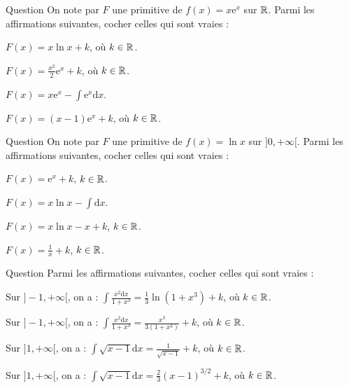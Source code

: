 \begin{multi}[multiple,feedback=
{Une intégration par parties avec \(u=x\) et \(v=\mathrm{e}^x\) donne
\[F(x)=x\mathrm{e}^x-\int \mathrm{e}^x\mathrm{d}x=x\mathrm{e}^x-\mathrm{e}^x+k,\mbox{ où }k\in \Rr.\]
}]{Question}
On note par \(F\) une primitive de \(f(x)=x\mathrm{e}^x\) sur \(\mathbb{R}\). Parmi les affirmations suivantes, cocher celles qui sont vraies :

    \item \(\displaystyle F(x)=x\ln x+k\), où \(k\in \mathbb{R}\).
    \item \(\displaystyle F(x)=\frac{x^2}{2}\mathrm{e}^x+k\), où \(k\in \mathbb{R}\).
    \item* \(\displaystyle F(x)=x\mathrm{e}^x-\int \mathrm{e}^x\mathrm{d}x\).
    \item* \(\displaystyle F(x)=(x-1)\mathrm{e}^x+k\), où \(k\in \mathbb{R}\).
\end{multi}


\begin{multi}[multiple,feedback=
{Une intégration par parties avec \(u=\ln x\) et \(v=x\) donne
\[\int \ln x\mathrm{d}x=x\ln x-\int \mathrm{d}x=x\ln x-x+k,\; k\in \Rr.\]
}]{Question}
On note par \(F\) une primitive de \(f(x)=\ln x\) sur \(]0,+\infty[\). Parmi les affirmations suivantes, cocher celles qui sont vraies :

    \item \(\displaystyle F(x)=\mathrm{e}^{x}+k\), \(k\in \mathbb{R}\).
    \item* \(\displaystyle F(x)=x\ln x-\int \mathrm{d}x\).
    \item* \(\displaystyle F(x)=x\ln x-x+k\), \(k\in \mathbb{R}\).
    \item \(\displaystyle F(x)=\frac{1}{x}+k\), \(k\in \mathbb{R}\).
\end{multi}


\begin{multi}[multiple,feedback=
{Avec \(u=1+x^3\), on a : \(\mathrm{d}u=3x^2\mathrm{d}x\) et
\[\int \frac{x^2\mathrm{d}x}{1+x^3}=\frac{1}{3}\int \frac{\mathrm{d}u}{u}=\frac{1}{3}\ln |u|+k=\frac{1}{3}\ln (1+x^3)+k,\; k\in \Rr.\]
De m\^eme, avec \(u=x-1\), on a \(\mathrm{d}u=\mathrm{d}x\) et
\[\int \sqrt{x-1}\mathrm{d}x=\int \sqrt{u}\mathrm{d}u=\frac{2}{3}u^{3/2}+k=\frac{2}{3}(x-1)^{3/2}+k,\; k\in \Rr.\]
}]{Question}
Parmi les affirmations suivantes, cocher celles qui sont vraies :

    \item* Sur \(]-1,+\infty[\), on a : \(\displaystyle \int \frac{x^2\mathrm{d}x}{1+x^3}=\frac{1}{3}\ln (1+x^3)+k\), où \(k\in \mathbb{R}\).
    \item Sur \(]-1,+\infty[\), on a : \(\displaystyle \int \frac{x^2\mathrm{d}x}{1+x^3}=\frac{x^3}{3(1+x^3)}+k\), où \(k\in \mathbb{R}\).
    \item Sur \(]1,+\infty[\), on a : \(\displaystyle \int \sqrt{x-1}\mathrm{d}x=\frac{1}{\sqrt{x-1}}+k\), où \(k\in \mathbb{R}\).
    \item* Sur \(]1,+\infty[\), on a : \(\displaystyle \int \sqrt{x-1}\mathrm{d}x=\frac{2}{3}(x-1)^{3/2}+k\), où \(k\in \mathbb{R}\).
\end{multi}


